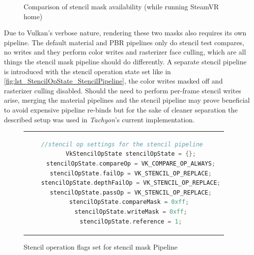 \begin{figure}[h]
  \centering
  \hspace*{\fill}
  \hfill
  \hspace*{\fill}
     \caption{Comparison of stencil mask availability (while running SteamVR home)}
     \label{fig:empty_mask}
\end{figure}

Due to Vulkan's verbose nature, rendering these two masks also requires its own pipeline. The default material and PBR pipelines only do stencil test compares, no writes and they perform color writes and rasterizer face culling, which are all things the stencil mask pipeline should do differently. A separate stencil pipeline is introduced with the stencil operation state set like in \autoref{fig:lst_StencilOpState_StencilPipeline}, the color writes masked off and rasterizer culling disabled. Should the need to perform per-frame stencil writes arise, merging the material pipelines and the stencil pipeline may prove beneficial to avoid expensive pipeline re-binds but for the sake of cleaner separation the described setup was used in \textit{\gls{Tachyon}}'s current implementation. 

\begin{figure}[htb]
  \centering
  \begin{tabular}{c}
  \begin{lstlisting}[language=C++]
	//stencil op settings for the stencil pipeline 
	VkStencilOpState stencilOpState = {};
	stencilOpState.compareOp = VK_COMPARE_OP_ALWAYS;
	stencilOpState.failOp = VK_STENCIL_OP_REPLACE;
	stencilOpState.depthFailOp = VK_STENCIL_OP_REPLACE;
	stencilOpState.passOp = VK_STENCIL_OP_REPLACE;
	stencilOpState.compareMask = 0xff; 
	stencilOpState.writeMask = 0xff;
	stencilOpState.reference = 1;
	\end{lstlisting}
  \end{tabular}
  \caption[Stencil pipeline stencil operation flags]{Stencil operation flags set for stencil mask Pipeline}\label{fig:lst_StencilOpState_StencilPipeline}
\end{figure}
